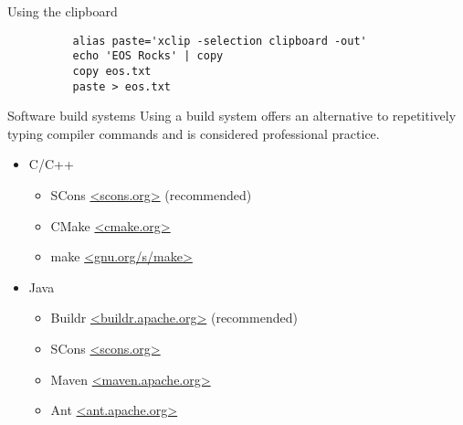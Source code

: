 \documentclass[8pt]{beamer}
\begin{document}
\begin{frame}[fragile]{}
\begin{columns}
\begin{column}{0.33\textwidth}
\begin{block}{Using the clipboard}
\begin{verbatim}
          alias paste='xclip -selection clipboard -out'
          echo 'EOS Rocks' | copy
          copy eos.txt
          paste > eos.txt
        \end{verbatim}
      \end{block}
      \begin{block}{Software build systems}
        Using a build system offers an alternative to repetitively typing compiler commands and is considered professional practice.
        \begin{itemize}
        \item C/C++
          \begin{itemize}
          \item SCons \url{<scons.org>} (recommended)
          \item CMake \url{<cmake.org>}
          \item make \url{<gnu.org/s/make>}
          \end{itemize}
        \item Java
          \begin{itemize}
          \item Buildr \url{<buildr.apache.org>} (recommended)
          \item SCons \url{<scons.org>}
          \item Maven \url{<maven.apache.org>}
          \item Ant \url{<ant.apache.org>}
          \end{itemize}
        \end{itemize}
      \end{block}
    \end{column}
  \end{columns}
\end{frame}

\end{document}
